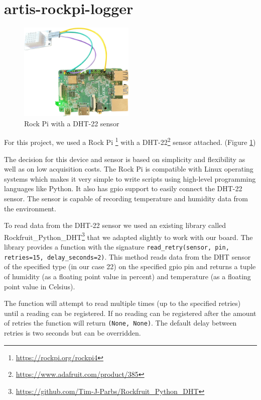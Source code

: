 \clearpage
\section{artis-rockpi-logger}
\begin{figure}
    \centering
    \includegraphics[width=0.49\textwidth]{resources/rock-pi.png}
    \caption{Rock Pi with a DHT-22 sensor} 
    \label{fig:rock-pi}
\end{figure}
For this project, we used a Rock Pi \footnote{\href{https://rockpi.org/rockpi4}{https://rockpi.org/rockpi4}} with a DHT-22\footnote{\href{https://www.adafruit.com/product/385}{https://www.adafruit.com/product/385}} sensor attached. (Figure \ref{fig:rock-pi})

The decision for this device and sensor is based on simplicity and flexibility as well as on low acquisition costs. The Rock Pi is compatible with Linux operating systems which makes it very simple to write scripts using high-level programming languages like Python. It also has \gls{gpio} support to easily connect the DHT-22 sensor. The sensor is capable of recording temperature and humidity data from the environment.

To read data from the DHT-22 sensor we used an existing library called Rockfruit\_Python\_DHT\footnote{\href{https://github.com/Tim-J-Parbs/Rockfruit_Python_DHT}{https://github.com/Tim-J-Parbs/Rockfruit\_Python\_DHT}} that we adapted slightly to work with our board. The library provides a function with the signature \texttt{read\_retry(sensor, pin, retries=15, delay\_seconds=2)}. This method reads data from the DHT sensor of the specified type (in our case 22) on the specified \gls{gpio} pin and returns a tuple of humidity (as a floating point value in percent) and temperature (as a floating point value in Celsius). 

The function will attempt to read multiple times (up to the specified retries) until a reading can be registered. If no reading can be registered after the amount of retries the function will return \texttt{(None, None)}. The default delay between retries is two seconds but can be overridden.

